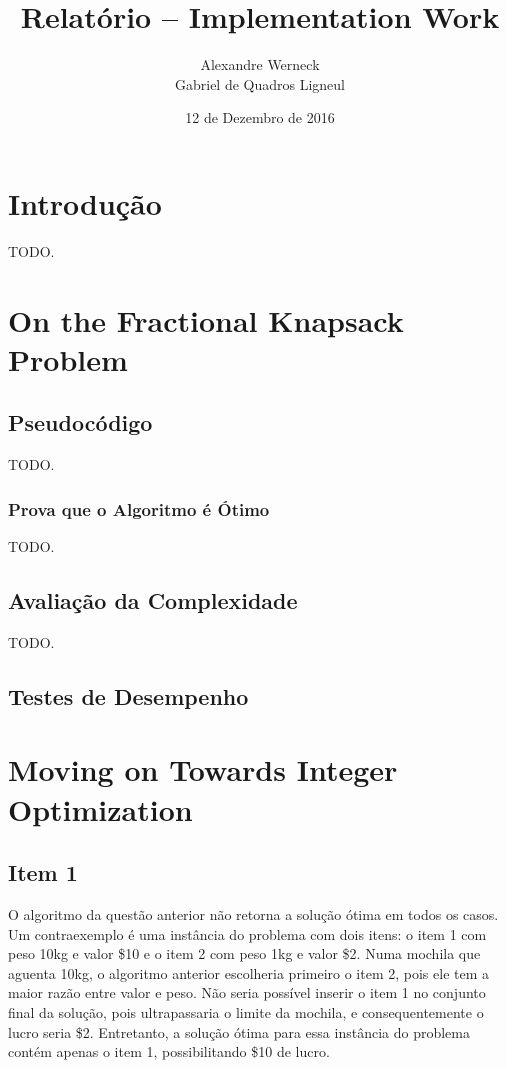 \documentclass[a4paper, 11pt]{article}
\title{Relatório -- Implementation Work}
\author{Alexandre Werneck\\Gabriel de Quadros Ligneul}
\date{12 de Dezembro de 2016}
\begin{document}
\maketitle

\section{Introdução}

TODO.

\section{On the Fractional Knapsack Problem}

\subsection{Pseudocódigo}

TODO.

\subsubsection{Prova que o Algoritmo é Ótimo}

TODO.

\subsection{Avaliação da Complexidade}

TODO.

\subsection{Testes de Desempenho}

\section{Moving on Towards Integer Optimization}

\subsection{Item 1}

O algoritmo da questão anterior não retorna a solução ótima em todos os casos. Um contraexemplo é uma instância do problema com dois itens: o item 1 com peso 10kg e valor \$10 e o item 2 com peso 1kg e valor \$2. Numa mochila que aguenta 10kg, o algoritmo anterior escolheria primeiro o item 2, pois ele tem a maior razão entre valor e peso. Não seria possível inserir o item 1 no conjunto final da solução, pois ultrapassaria o limite da mochila, e consequentemente o lucro seria \$2. Entretanto, a solução ótima para essa instância do problema contém apenas o item 1, possibilitando \$10 de lucro.
\end{document}
